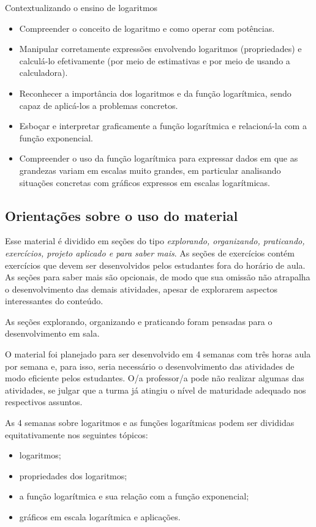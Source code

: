 \begin{apresentacao}{Contextualizando o ensino de logaritmos}
\begin{itemize}
\item  Compreender o conceito de logaritmo e como operar com potências.
\item Manipular corretamente expressões envolvendo logaritmos (propriedades) e calculá-lo efetivamente
(por meio de estimativas e por meio de usando a calculadora).
\item Reconhecer a importância dos logaritmos e da função logarítmica, sendo capaz de
aplicá-los a problemas concretos.
\item Esboçar e interpretar graficamente a função logarítmica e relacioná-la com a função
exponencial.
\item Compreender o uso da função logarítmica para expressar dados em que as grandezas
variam em escalas muito grandes, em particular analisando situações concretas com
gráficos expressos em escalas logarítmicas.
\end{itemize}

\subsection*{Orientações sobre o uso do material}

Esse material é dividido em seções do tipo \textit{explorando, organizando, praticando, exercícios, projeto aplicado e para saber mais}. As seções de exercícios contém exercícios que devem ser desenvolvidos pelos estudantes fora do horário de aula. As seções para saber mais são opcionais, de modo que sua omissão não atrapalha o desenvolvimento das demais atividades, apesar de explorarem aspectos interessantes do conteúdo.

As seções explorando, organizando e praticando foram pensadas para o desenvolvimento em sala.

O material foi planejado para ser desenvolvido em 4 semanas com três horas aula por semana e, para isso, seria necessário o desenvolvimento das atividades de modo eficiente pelos estudantes. O/a professor/a pode não realizar algumas das atividades, se julgar que a turma já atingiu o nível de maturidade adequado nos respectivos assuntos.

As 4 semanas sobre logaritmos e as funções logarítmicas podem ser divididas equitativamente nos seguintes tópicos:
\begin{itemize}
\item logaritmos;
\item propriedades dos logaritmos;
\item a função logarítmica e sua relação com a função exponencial;
\item gráficos em escala logarítmica e aplicações.
\end{itemize}


\end{apresentacao}
